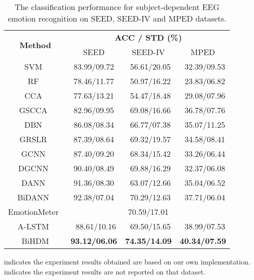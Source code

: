 \documentclass[journal]{IEEEtran}
\begin{document}
\begin{table}[htb]
	\caption{The classification performance for subject-dependent EEG emotion recognition on SEED, SEED-IV and MPED datasets.}
	\centering
	\renewcommand{\arraystretch}{1.3}
	\begin{threeparttable}		
		\begin{tabular}{|c|c|c|c|} \hline
			\multirow{2}{*}{\textbf{Method}} & \multicolumn{3}{c|}{\textbf{ACC / STD (\%)}} \\ \cline{2-4}
			&  SEED            & SEED-IV          &   MPED\\ \hline
			SVM~\cite{suykens1999least}          & 83.99/09.72      & ~56.61/20.05&~32.39/09.53\\ \hline
			RF~\cite{breiman2001random}           & 78.46/11.77      & ~50.97/16.22&~23.83/06.82\\ \hline
			CCA~\cite{thompson2005canonical}          & 77.63/13.21      & ~54.47/18.48&~29.08/07.96\\ \hline
			GSCCA~\cite{zheng2016Multichannel}        & 82.96/09.95      & ~69.08/16.66&~36.78/07.76\\ \hline
			DBN~\cite{zheng2015investigating}          & 86.08/08.34      & ~66.77/07.38&~35.07/11.25\\ \hline
			GRSLR~\cite{li2018eeg}        & 87.39/08.64      & ~69.32/19.57&~34.58/08.41\\ \hline
			GCNN~\cite{defferrard2016convolutional}         & 87.40/09.20      & ~68.34/15.42&~33.26/06.44\\ \hline
			DGCNN~\cite{song2018eeg}        & 90.40/08.49      & ~69.88/16.29&~32.37/06.08\\ \hline
			DANN~\cite{ganin2016domain}         & 91.36/08.30      & ~63.07/12.66&~35.04/06.52\\ \hline
			BiDANN~\cite{li2018novel}       & 92.38/07.04      & ~70.29/12.63&~37.71/06.04\\ \hline
			EmotionMeter~\cite{zheng2018emotionmeter}     &               & 70.59/17.01     &             \\ \hline
			A-LSTM~\cite{8606087}       &~88.61/10.16  & ~69.50/15.65&~38.99/07.53\\ \hline
			BiHDM    &\textbf{93.12/06.06} &\textbf{74.35/14.09}&\textbf{40.34/07.59}   \\ \hline
		\end{tabular}
		\begin{tablenotes}[para]
			\footnotesize  indicates the experiment results obtained are based on our own implementation.\\
			 indicates the experiment results are not reported on that dataset.
		\end{tablenotes}
	\end{threeparttable}
	\label{Table: dep}
\end{table}
\end{document}
